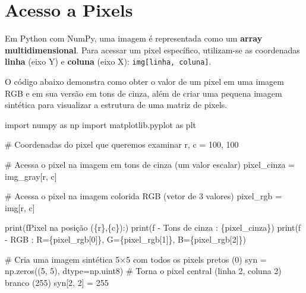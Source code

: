 \documentclass[
  portuguese,
  letterpaper,
  openany,
  oneside,
  12pt,
  a4paper]{book}
\newenvironment{Shaded}{\begin{snugshade}}{\end{snugshade}}
\newcommand{\BuiltInTok}[1]{\textcolor[rgb]{0.00,0.23,0.31}{#1}}
\newcommand{\CommentTok}[1]{\textcolor[rgb]{0.37,0.37,0.37}{#1}}
\newcommand{\DecValTok}[1]{\textcolor[rgb]{0.68,0.00,0.00}{#1}}
\newcommand{\ImportTok}[1]{\textcolor[rgb]{0.00,0.46,0.62}{#1}}
\newcommand{\NormalTok}[1]{\textcolor[rgb]{0.00,0.23,0.31}{#1}}
\newcommand{\OperatorTok}[1]{\textcolor[rgb]{0.37,0.37,0.37}{#1}}
\newcommand{\SpecialCharTok}[1]{\textcolor[rgb]{0.37,0.37,0.37}{#1}}
\newcommand{\SpecialStringTok}[1]{\textcolor[rgb]{0.13,0.47,0.30}{#1}}
\begin{document}
\section{Acesso a Pixels}\label{acesso-a-pixels}

Em Python com NumPy, uma imagem é representada como um \textbf{array
multidimensional}. Para acessar um pixel específico, utilizam-se as
coordenadas \textbf{linha} (eixo Y) e \textbf{coluna} (eixo X):
\texttt{img{[}linha,\ coluna{]}}.

O código abaixo demonstra como obter o valor de um pixel em uma imagem
RGB e em sua versão em tons de cinza, além de criar uma pequena imagem
sintética para visualizar a estrutura de uma matriz de pixels.

\begin{Shaded}
\begin{Highlighting}[]
\ImportTok{import}\NormalTok{ numpy }\ImportTok{as}\NormalTok{ np}
\ImportTok{import}\NormalTok{ matplotlib.pyplot }\ImportTok{as}\NormalTok{ plt}

\CommentTok{\# Coordenadas do pixel que queremos examinar}
\NormalTok{r, c }\OperatorTok{=} \DecValTok{100}\NormalTok{, }\DecValTok{100}

\CommentTok{\# Acessa o pixel na imagem em tons de cinza (um valor escalar)}
\NormalTok{pixel\_cinza }\OperatorTok{=}\NormalTok{ img\_gray[r, c]}

\CommentTok{\# Acessa o pixel na imagem colorida RGB (vetor de 3 valores)}
\NormalTok{pixel\_rgb }\OperatorTok{=}\NormalTok{ img[r, c]}

\BuiltInTok{print}\NormalTok{(}\SpecialStringTok{f\textquotesingle{}Pixel na posição (}\SpecialCharTok{\{}\NormalTok{r}\SpecialCharTok{\}}\SpecialStringTok{,}\SpecialCharTok{\{}\NormalTok{c}\SpecialCharTok{\}}\SpecialStringTok{):\textquotesingle{}}\NormalTok{)}
\BuiltInTok{print}\NormalTok{(}\SpecialStringTok{f\textquotesingle{}  {-} Tons de cinza : }\SpecialCharTok{\{}\NormalTok{pixel\_cinza}\SpecialCharTok{\}}\SpecialStringTok{\textquotesingle{}}\NormalTok{)}
\BuiltInTok{print}\NormalTok{(}\SpecialStringTok{f\textquotesingle{}  {-} RGB           : R=}\SpecialCharTok{\{}\NormalTok{pixel\_rgb[}\DecValTok{0}\NormalTok{]}\SpecialCharTok{\}}\SpecialStringTok{, G=}\SpecialCharTok{\{}\NormalTok{pixel\_rgb[}\DecValTok{1}\NormalTok{]}\SpecialCharTok{\}}\SpecialStringTok{, B=}\SpecialCharTok{\{}\NormalTok{pixel\_rgb[}\DecValTok{2}\NormalTok{]}\SpecialCharTok{\}}\SpecialStringTok{\textquotesingle{}}\NormalTok{)}

\CommentTok{\# Cria uma imagem sintética 5×5 com todos os pixels pretos (0)}
\NormalTok{syn }\OperatorTok{=}\NormalTok{ np.zeros((}\DecValTok{5}\NormalTok{, }\DecValTok{5}\NormalTok{), dtype}\OperatorTok{=}\NormalTok{np.uint8)}
\CommentTok{\# Torna o pixel central (linha 2, coluna 2) branco (255)}
\NormalTok{syn[}\DecValTok{2}\NormalTok{, }\DecValTok{2}\NormalTok{] }\OperatorTok{=} \DecValTok{255}


\end{Highlighting}
\end{Shaded}
\end{document}
